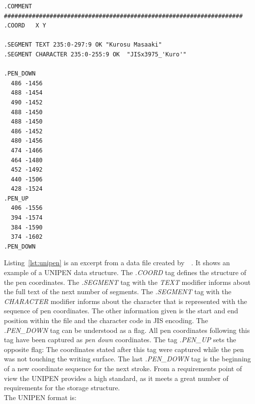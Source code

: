 \begin{xmlcode}
  \begin{lstlisting}[emph={COMMENT,COORD,SEGMENT},emphstyle=\textbf,caption={Demonstration of the \emph{UNIPEN} format},label=lst:unipen]
.COMMENT #################################################################### 
.COORD   X Y

.SEGMENT TEXT 235:0-297:9 OK "Kurosu Masaaki"
.SEGMENT CHARACTER 235:0-255:9 OK  "JISx3975_'Kuro'"

.PEN_DOWN 
  486 -1456 
  488 -1454 
  490 -1452 
  488 -1450 
  488 -1450 
  486 -1452 
  480 -1456 
  474 -1466 
  464 -1480 
  452 -1492 
  440 -1506 
  428 -1524
.PEN_UP 
  406 -1556 
  394 -1574 
  384 -1590 
  374 -1602
.PEN_DOWN 
  \end{lstlisting}
\end{xmlcode}
Listing~\ref{lst:unipen} is an excerpt from a data file created 
by~~\citeyear{Unipen}. It shows an example of a UNIPEN data structure.
The \emph{.COORD} tag defines the structure of the pen coordinates. 
The \emph{.SEGMENT} tag with the \emph{TEXT} modifier informs about the
full text of the next number of segments. The \emph{.SEGMENT} tag with the
\emph{CHARACTER} modifier informs about the character that is represented
with the sequence of pen coordinates. The other information given is the
start and end position within the file and the character code in JIS encoding.
The \emph{.PEN\_DOWN} tag can be understood as a flag. All pen coordinates 
following this tag have been captured as \emph{pen down} coordinates.
The tag \emph{.PEN\_UP} sets the opposite flag: The coordinates stated after 
this tag were captured while the pen was not touching the writing surface.
The last \emph{.PEN\_DOWN} tag is the beginning of a new coordinate sequence
for the next stroke. From a requirements point of view the UNIPEN provides a
high standard, as it meets a great number of requirements for the storage 
structure. \\
The UNIPEN format is:
